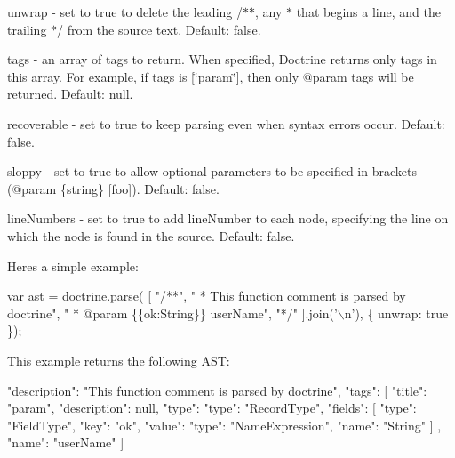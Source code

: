 \begin{DoxyItemize}
\item {\ttfamily unwrap} -\/ set to {\ttfamily true} to delete the leading {\ttfamily /$\ast$$\ast$}, any {\ttfamily $\ast$} that begins a line, and the trailing {\ttfamily $\ast$/} from the source text. Default\+: {\ttfamily false}.
\item {\ttfamily tags} -\/ an array of tags to return. When specified, Doctrine returns only tags in this array. For example, if {\ttfamily tags} is {\ttfamily \mbox{[}\char`\"{}param\char`\"{}\mbox{]}}, then only {\ttfamily @param} tags will be returned. Default\+: {\ttfamily null}.
\item {\ttfamily recoverable} -\/ set to {\ttfamily true} to keep parsing even when syntax errors occur. Default\+: {\ttfamily false}.
\item {\ttfamily sloppy} -\/ set to {\ttfamily true} to allow optional parameters to be specified in brackets ({\ttfamily @param \{string\} \mbox{[}foo\mbox{]}}). Default\+: {\ttfamily false}.
\item {\ttfamily line\+Numbers} -\/ set to {\ttfamily true} to add {\ttfamily line\+Number} to each node, specifying the line on which the node is found in the source. Default\+: {\ttfamily false}.
\end{DoxyItemize}

Here\textquotesingle{}s a simple example\+:


\begin{DoxyCode}
var ast = doctrine.parse(
    [
        "/**",
        " * This function comment is parsed by doctrine",
        " * @param \{\{ok:String\}\} userName",
        "*/"
    ].join('\(\backslash\)n'), \{ unwrap: true \});
\end{DoxyCode}


This example returns the following A\+ST\+: \begin{DoxyVerb}{
    "description": "This function comment is parsed by doctrine",
    "tags": [
        {
            "title": "param",
            "description": null,
            "type": {
                "type": "RecordType",
                "fields": [
                    {
                        "type": "FieldType",
                        "key": "ok",
                        "value": {
                            "type": "NameExpression",
                            "name": "String"
                        }
                    }
                ]
            },
            "name": "userName"
        }
    ]
}
\end{DoxyVerb}


